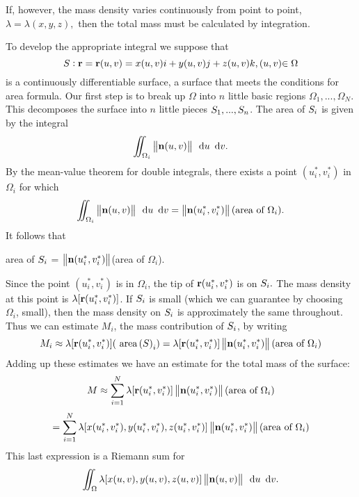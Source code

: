 If, however, the mass density varies continuously from point to point, $%
\lambda =\lambda (x,y,z),$ then the total mass must be calculated by
integration.

To develop the appropriate integral we suppose that
\[
S:\mathbf{ r}=\mathbf{ r}(u,v)=x(u,v)i+y(u,v)j+z(u,v)k,(u,v){\in \Omega }
\]
is a continuously differentiable surface, a surface that meets the
conditions for area formula. Our first step is to break up ${\Omega }$ into $%
n$ little basic regions $\Omega _1,...,\Omega _N.$ This decomposes the
surface into $n$ little pieces $S_1,...,S_n$. The area of $S_i$ is given by
the integral
\[
\diint_{\Omega _i}\left\| \vector{n}(u,v)\right\| \,\du\dv.
\]
By the mean-value theorem for double integrals, there exists a point $%
(u_i^{*},v_i^{*})$ in $\Omega _i$ for which
\[
\diint_{\Omega _i}\left\|\vector{n}(u,v)\right\| \,\du\dv=\left\|
 \vector{n}(u_i^{*},v_i^{*})\right\| \text{(area of }\Omega _i\text{).}
\]
It follows that

\begin{center}
area of $S_i$ = $\left\|  \mathbf{ n}(u_i^{*},v_i^{*})\right\| $(area of $\Omega _i$).
\end{center}

Since the point $(u_i^{*},v_i^{*})$ is in $\Omega _i$, the tip of $%
\funvect{r}(u_i^{*},v_i^{*})$ is on $S_i.$ The mass density at this point is $\lambda
[\mathbf{ r}(u_i^{*},v_i^{*})]$. If $S_i$ is small (which we can guarantee by choosing
$\Omega _i$, small), then the mass density on $S_i$ is approximately the
same throughout. Thus we can estimate $M_i$, the mass contribution of $S_i$,
by writing
\[
M_i\approx \lambda [\funvect{r}(u_i^{*},v_i^{*})](\area{S}_i)=\lambda
[\funvect{r}(u_i^{*},v_i^{*})]\left\|  \vector{n}(u_i^{*},v_i^{*})\right\| (\text{area of}\
\Omega _i)
\]
Adding up these estimates we have an estimate for the total mass of the
surface:
\[
M\approx \sum_{i=1}^N\lambda [\mathbf{ r}(u_i^{*},v_i^{*})]\left\|
 \mathbf{ n}(u_i^{*},v_i^{*})\right\| (\text{area of}\ \Omega _i)
\]
\[
=\sum_{i=1}^N\lambda
[x(u_i^{*},v_i^{*}),y(u_i^{*},v_i^{*}),z(u_i^{*},v_i^{*})]\left\|
\mathbf{ n}(u_i^{*},v_i^{*})\right\| (\text{area of}\ \Omega _i)
\]
This last expression is a Riemann sum for
\[
\diint_\Omega \lambda [x(u,v),y(u,v),z(u,v)]\left\| \vector{n}(u,v)\right\| \,\du\dv.
\]


